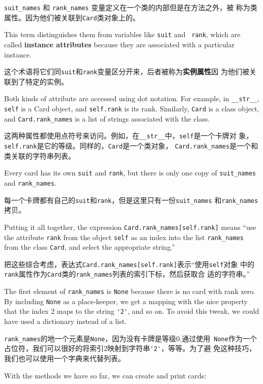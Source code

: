 \documentclass[10pt]{book}
\begin{document}
\begin{CJK}{UTF8}{gbsn}
\verb"suit_names" 和 \verb"rank_names" 变量定义在一个类的内部但是在方法之外，被
称为类属性。因为他们被关联到{\tt Card}类对象上的。

This term distinguishes them from variables like {\tt suit} and {\tt
  rank}, which are called {\bf instance attributes} because they are
associated with a particular instance.

这个术语将它们同{\tt suit}和{\tt rank}变量区分开来，后者被称为{\bf 实例属性}因
为他们被关联到了特定的实例。

Both kinds of attribute are accessed using dot notation.  For
example, in \verb"__str__", {\tt self} is a Card object,
and {\tt self.rank} is its rank.  Similarly, {\tt Card}
is a class object, and \verb"Card.rank_names" is a
list of strings associated with the class.

这两种属性都使用点符号来访问。例如，在\verb"__str__"中，{\tt self}是一个卡牌对
象，{\tt self.rank}是它的等级。同样的，{\tt Card}是一个类对象，
\verb"Card.rank_names"是一个和类关联的字符串列表。

Every card has its own {\tt suit} and {\tt rank}, but there
is only one copy of \verb"suit_names" and \verb"rank_names".

每一个卡牌都有自己的{\tt suit}和{\tt rank}，但是这里只有一份\verb"suit_names"
和\verb"rank_names"拷贝。


Putting it all together, the expression
\verb"Card.rank_names[self.rank]" means ``use the attribute {\tt rank}
from the object {\tt self} as an index into the list \verb"rank_names"
from the class {\tt Card}, and select the appropriate string.''

把这些综合考虑，表达式\verb"Card.rank_names[self.rank]"表示``使用{\tt self}对象
中的{\tt rank}属性作为{\tt Card}类的\verb"rank_names"列表的索引下标，然后获取合
适的字符串。''

The first element of \verb"rank_names" is {\tt None} because there
is no card with rank zero.  By including {\tt None} as a place-keeper,
we get a mapping with the nice property that the index 2 maps to the
string \verb"'2'", and so on.  To avoid this tweak, we could have
used a dictionary instead of a list.

\verb"rank_names"的地一个元素是{\tt None}，因为没有卡牌是等级0.通过使用{\tt
None}作为一个占位符，我们可以很好的将索引2映射到字符串\verb"'2'"，等等。为了避
免这种技巧，我们也可以使用一个字典来代替列表。

With the methods we have so far, we can create and print cards:


\end{CJK}
\end{document}

